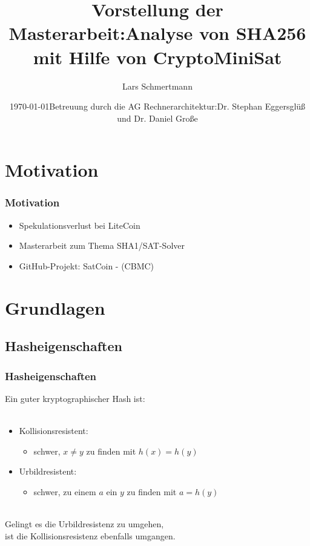 \documentclass{beamer}
\title[Analyse von SHA256 mit Hilfe von CryptoMiniSat]{Vorstellung der Masterarbeit:\newline Analyse von SHA256 mit Hilfe von CryptoMiniSat}
\author{Lars Schmertmann}
\date{\today\newline\newline\newline Betreuung durch die AG Rechnerarchitektur:\newline Dr. Stephan Eggersglüß und Dr. Daniel Große}
\begin{document}
\maketitle


\section{Motivation}
  \begin{frame}
    \frametitle{Motivation}
    \begin{itemize}
      \setlength{\itemsep}{20pt}
      \item Spekulationsverlust bei LiteCoin
      \item Masterarbeit zum Thema SHA1/SAT-Solver
      \item GitHub-Projekt: SatCoin - (CBMC)
    \end{itemize}
  \end{frame}
\section{Grundlagen}
  \subsection{Hasheigenschaften}
    \begin{frame}
      \frametitle{Hasheigenschaften}
      Ein guter kryptographischer Hash ist:\\
      ~\\
      \begin{itemize}
        \setlength{\itemsep}{20pt}
        \item Kollisionsresistent:
        \begin{itemize}
          \item schwer, $ x \neq y $ zu finden mit $ h(x) = h(y) $
        \end{itemize}
        \item Urbildresistent:
        \begin{itemize}
          \item schwer, zu einem $ a $ ein $ y $ zu finden mit $ a = h(y) $
        \end{itemize}
      \end{itemize}
      ~\\
      Gelingt es die Urbildresistenz zu umgehen,\\
      ist die Kollisionsresistenz ebenfalls umgangen.
    \end{frame}
\end{document}

